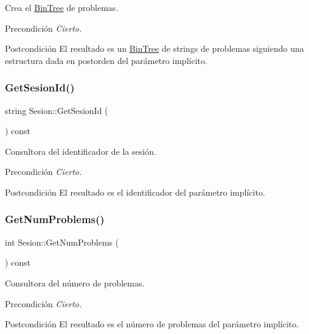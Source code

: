 Crea el \mbox{\hyperlink{class_bin_tree}{Bin\+Tree}} de problemas. 

\begin{DoxyPrecond}{Precondición}
{\itshape Cierto.} 
\end{DoxyPrecond}
\begin{DoxyPostcond}{Postcondición}
El resultado es un \mbox{\hyperlink{class_bin_tree}{Bin\+Tree}} de strings de problemas siguiendo una estructura dada en postorden del parámetro implícito. 
\end{DoxyPostcond}
\mbox{\label{class_sesion_a9f3c532f36fb49a6caa5dd82b9ee9a3f}} 
\subsubsection{\texorpdfstring{Get\+Sesion\+Id()}{GetSesionId()}}
{\footnotesize\ttfamily string Sesion\+::\+Get\+Sesion\+Id (\begin{DoxyParamCaption}{ }\end{DoxyParamCaption}) const}



Consultora del identificador de la sesión. 

\begin{DoxyPrecond}{Precondición}
{\itshape Cierto.} 
\end{DoxyPrecond}
\begin{DoxyPostcond}{Postcondición}
El resultado es el identificador del parámetro implícito. 
\end{DoxyPostcond}
\mbox{\label{class_sesion_ad770a0d4c75b0b2d70fa6c5cdcf336ec}} 
\subsubsection{\texorpdfstring{Get\+Num\+Problems()}{GetNumProblems()}}
{\footnotesize\ttfamily int Sesion\+::\+Get\+Num\+Problems (\begin{DoxyParamCaption}{ }\end{DoxyParamCaption}) const}



Consultora del número de problemas. 

\begin{DoxyPrecond}{Precondición}
{\itshape Cierto.} 
\end{DoxyPrecond}
\begin{DoxyPostcond}{Postcondición}
El resultado es el número de problemas del parámetro implícito. 
\end{DoxyPostcond}
\mbox{\label{class_sesion_af8f21957c77c2a3f7a1f923f2779cc41}} 
